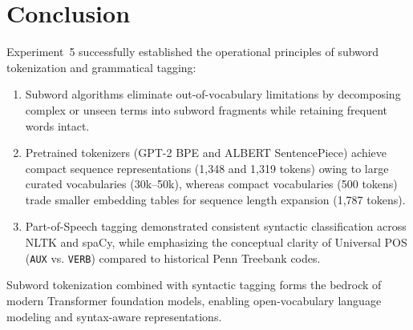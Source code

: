 \section{Conclusion}
Experiment~5 successfully established the operational principles of subword tokenization and grammatical tagging:
\begin{enumerate}
    \item Subword algorithms eliminate out-of-vocabulary limitations by decomposing complex or unseen terms into subword fragments while retaining frequent words intact.
    \item Pretrained tokenizers (GPT-2 BPE and ALBERT SentencePiece) achieve compact sequence representations (1,348 and 1,319 tokens) owing to large curated vocabularies (30k--50k), whereas compact vocabularies (500 tokens) trade smaller embedding tables for sequence length expansion (1,787 tokens).
    \item Part-of-Speech tagging demonstrated consistent syntactic classification across NLTK and spaCy, while emphasizing the conceptual clarity of Universal POS (\texttt{AUX} vs. \texttt{VERB}) compared to historical Penn Treebank codes.
\end{enumerate}
Subword tokenization combined with syntactic tagging forms the bedrock of modern Transformer foundation models, enabling open-vocabulary language modeling and syntax-aware representations.
